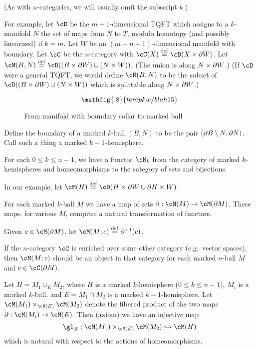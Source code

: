 (As with $n$-categories, we will usually omit the subscript $k$.)

For example, let $\cD$ be the $m{+}1$-dimensional TQFT which assigns to a $k$-manifold $N$ the set 
of maps from $N$ to $T$, modulo homotopy (and possibly linearized) if $k=m$.
Let $W$ be an $(m{-}n{+}1)$-dimensional manifold with boundary.
Let $\cC$ be the $n$-category with $\cC(X) \deq \cD(X\times \bd W)$.
Let $\cM(B, N) \deq \cD((B\times \bd W)\cup (N\times W))$.
(The union is along $N\times \partial W$.)
(If $\cD$ were a general TQFT, we would define $\cM(B, N)$ to be
the subset of $\cD((B\times \bd W)\cup (N\times W))$ which is splittable along $N\times \partial W$.)

\begin{figure}[!ht]
$$\mathfig{.8}{tempkw/blah15}$$
\caption{From manifold with boundary collar to marked ball}\label{blah15}\end{figure}

Define the boundary of a marked $k$-ball $(B, N)$ to be the pair $(\partial B \setminus N, \partial N)$.
Call such a thing a {marked $k{-}1$-hemisphere}.

{For each $0 \le k \le n-1$, we have a functor $\cM_k$ from 
the category of marked $k$-hemispheres and 
homeomorphisms to the category of sets and bijections.}

In our example, let $\cM(H) \deq \cD(H\times\bd W \cup \bd H\times W)$.

{For each marked $k$-ball $M$ we have a map of sets $\bd: \cM(M)\to \cM(\bd M)$.
These maps, for various $M$, comprise a natural transformation of functors.}

Given $c\in\cM(\bd M)$, let $\cM(M; c) \deq \bd^{-1}(c)$.

If the $n$-category $\cC$ is enriched over some other category (e.g.\ vector spaces),
then $\cM(M; c)$ should be an object in that category for each marked $n$-ball $M$
and $c\in \cC(\bd M)$.

{Let $H = M_1 \cup_E M_2$, where $H$ is a marked $k$-hemisphere ($0\le k\le n-1$),
$M_i$ is a marked $k$-ball, and $E = M_1\cap M_2$ is a marked $k{-}1$-hemisphere.
Let $\cM(M_1) \times_{\cM(E)} \cM(M_2)$ denote the fibered product of the 
two maps $\bd: \cM(M_i)\to \cM(E)$.
Then (axiom) we have an injective map
\[
	\gl_E : \cM(M_1) \times_{\cM(E)} \cM(M_2) \hookrightarrow \cM(H)
\]
which is natural with respect to the actions of homeomorphisms.}


